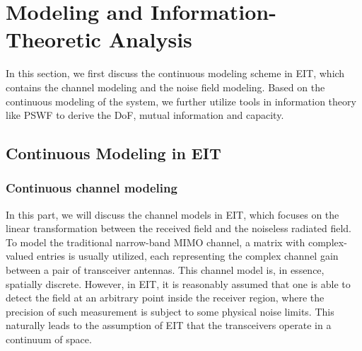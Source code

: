 \documentclass[journal,twocolumn]{IEEEtran}
\begin{document}
\section{Modeling and Information-Theoretic Analysis}
In this section, we first discuss the continuous modeling scheme in EIT, which contains the channel modeling and the noise field modeling. 
Based on the continuous modeling of the system, we further utilize tools in information theory like PSWF to derive the DoF, mutual information and capacity.

\subsection{Continuous Modeling in EIT}
\subsubsection{Continuous channel modeling}
In this part, we will discuss the channel models in EIT, which focuses on the linear transformation between the received field and the noiseless radiated field. 
To model the traditional narrow-band MIMO channel, a matrix with complex-valued entries is usually utilized, each representing the complex channel gain between a pair of transceiver antennas. 
This channel model is, in essence, spatially discrete. 
However, in EIT, it is reasonably assumed that one is able to detect the field at an arbitrary point inside the receiver region, where the precision of such measurement is subject to some physical noise limits. This naturally leads to the assumption of EIT that the transceivers operate in a continuum of space.  
\end{document}
